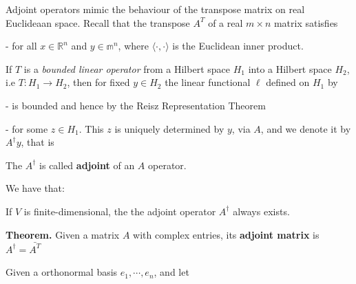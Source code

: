 \documentclass{article}
\begin{document}
Adjoint operators mimic the behaviour of the transpose matrix on real Euclideaan space. Recall that the transpose $A^T$ of a real $m \times n$ matrix satisfies


- for all $x \in \mathbb{R}^n$ and $y \in \mathbb{m}^n$, where $\langle \cdot, \cdot \rangle$ is the Euclidean inner product.


If $T$ is a \textit{bounded linear operator} from a Hilbert space $H_1$ into a Hilbert space  $H_2$, i.e $T: H_1 \rightarrow H_2$, then for fixed $y \in H_2$ the linear functional $\ell$ defined on $H_1$ by


- is bounded and hence by the Reisz Representation Theorem


- for some $z \in H_1$. This $z$ is uniquely determined by $y$, via $A$, and we denote it by $A^{\dag}y$, that is


The $A^{\dag}$ is called \textbf{adjoint} of an $A$ operator.

We have that:





If $V$ is finite-dimensional, the the adjoint operator $A^\dag $ always exists.


\textbf{Theorem.} Given a matrix $A$ with complex entries, its \textbf{adjoint matrix} is $A^\dag = \bar{A^{T}}$


Given a orthonormal basis $e_1, \cdots , e_n$, and let

\end{document}

